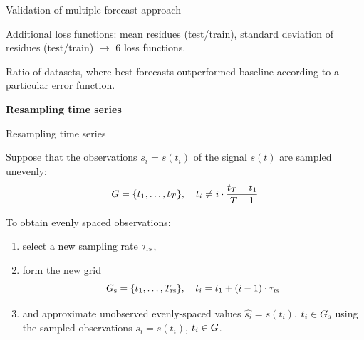 \documentclass{beamer}
\begin{document}
%
%
\begin{frame}{Validation of multiple forecast approach}

Additional loss functions: mean residues (test/train), standard deviation of residues (test/train) $\rightarrow$ 6 loss functions.


Ratio of datasets, where best forecasts outperformed baseline according to a particular error function.

\end{frame}
\begin{frame}
\vfill
\begin{center}
{\Large \bf Resampling time series}
\end{center}
\vfill
\end{frame}
\begin{frame}{Resampling time series}

Suppose that the observations $s_i = s(t_i)$ of the signal $s(t)$ are sampled unevenly:
\[G = \{t_1, \dots, t_T\}, \quad t_i \neq i\cdot\frac{t_T - t_1}{T-1} \]

\bigskip

To obtain evenly spaced observations:
\begin{enumerate}[1)]
\item select a new sampling rate $\tau_{\text{rs}}$,
\item form the new grid
\[G_{\text{s}} = \{t_1, \dots, T_{\text{rs}} \}, \quad t_i  = t_1 + (i-1)\cdot\tau_{\text{rs}} \]
\item and approximate
unobserved evenly-spaced values $\hat{s_i} = s(t_i)$, $t_i \in G_{\text{s}}$ using the sampled observations $s_i = s(t_i)$, $t_i \in G$.
\end{enumerate}

\end{frame}
\end{document}
